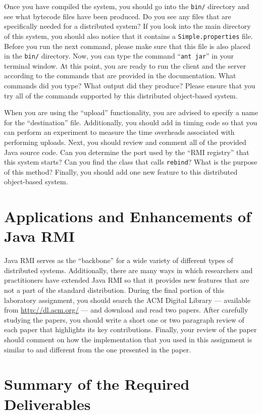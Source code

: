 Once you have compiled the system, you should go into the {\tt bin/} directory and see what bytecode files have been
produced. Do you see any files that are specifically needed for a distributed system? If you look into the main
directory of this system, you should also notice that it contains a {\tt Simple.properties} file. Before you run the
next command, please make sure that this file is also placed in the {\tt bin/} directory. Now, you can type the command
``{\tt ant jar}'' in your terminal window. At this point, you are ready to run the client and the server according to
the commands that are provided in the documentation. What commands did you type? What output did they produce? Please
ensure that you try all of the commands supported by this distributed object-based system.

When you are using the ``upload'' functionality, you are advised to specify a name for the ``destination'' file.
Additionally, you should add in timing code so that you can perform an experiment to measure the time overheads
associated with performing uploads. Next, you should review and comment all of the provided Java source code.  Can you
determine the port used by the ``RMI registry'' that this system starts? Can you find the class that calls {\tt rebind}?
What is the purpose of this method? Finally, you should add one new feature to this distributed object-based system.

\section*{Applications and Enhancements of Java RMI}

Java RMI serves as the ``backbone'' for a wide variety of different types of distributed systems. Additionally, there
are many ways in which researchers and practitioners have extended Java RMI so that it provides new features that are
not a part of the standard distribution. During the final portion of this laboratory assignment, you should search the
ACM Digital Library --- available from \url{http://dl.acm.org/} --- and download and read two papers. After carefully
studying the papers, you should write a short one or two paragraph review of each paper that highlights its key
contributions. Finally, your review of the paper should comment on how the implementation that you used in this
assignment is similar to and different from the one presented in the paper.

\section*{Summary of the Required Deliverables}

